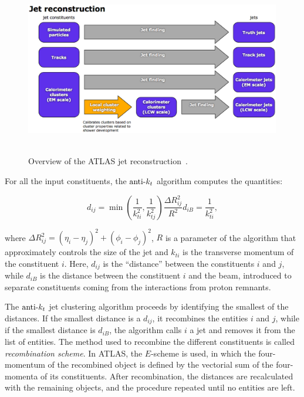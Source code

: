 \begin{figure}[!ht]
  \begin{center}
    \mbox{
      \includegraphics[width=0.995\textwidth]{ObjectReconstruction/Figures/JetReconstructionOverview.eps}
    }
  \end{center}
  \caption[Overview of the ATLAS jet reconstruction.]{Overview of the ATLAS jet reconstruction~\cite{Aad:2014bia}.}
  \label{fig:JetReconstructionOverview}
\end{figure}

For all the input constituents, the $\hbox{anti-${k_t}$}$ algorithm computes the quantities:

\begin{subequations}
    \begin{equation}
        d_{ij} = \min\left( \frac{1}{k_{ti}^{2}}, \frac{1}{k_{tj}^{2}} \right) \frac{\Delta R_{ij}^{2}}{R^2}
        \label{eq:AntiKt_dij}
    \end{equation}
    \begin{equation}
        d_{iB} = \frac{1}{k_{ti}^{2}},
        \label{eq:AntiKt_diB}
    \end{equation}
\end{subequations}

\noindent where $\Delta R_{ij}^{2} = (\eta_i - \eta_j)^2 + (\phi_i - \phi_j)^2$, $R$ is a parameter of the algorithm that approximately controls the size of the jet and $k_{ti}$ is the transverse momentum of the constituent $i$.
Here, $d_{ij}$ is the ``distance'' between the constituents $i$ and $j$, while $d_{iB}$ is the distance between the constituent $i$ and the beam, introduced to separate constituents coming from the interactions from proton remnants.

The $\hbox{anti-${k_t}$}$ jet clustering algorithm proceeds by identifying the smallest of the distances. 
If the smallest distance is a $d_{ij}$, it recombines the entities $i$ and $j$, while if the smallest distance is $d_{iB}$, the algorithm calls $i$ a jet and removes it from the list of entities.
The method used to recombine the different constituents is called \emph{recombination scheme}.
In ATLAS, the $E$-scheme is used, in which the four-momentum of the recombined object is defined by the vectorial sum of the four-momenta of its constituents.
After recombination, the distances are recalculated with the remaining objects, and the procedure repeated until no entities are left.

